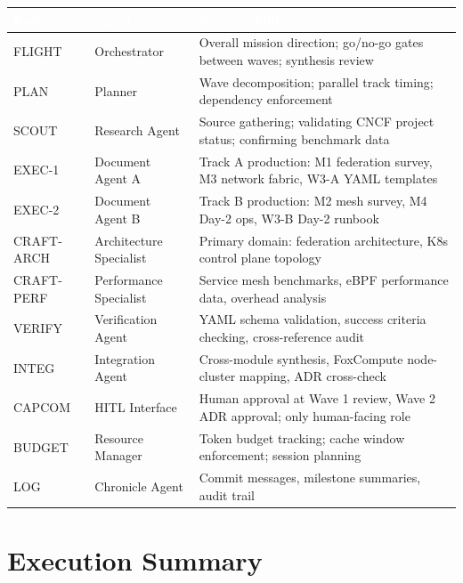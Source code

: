 \documentclass[11pt,letterpaper]{article}
\newcommand{\tableheader}[1]{\textbf{\sffamily\textcolor{white}{#1}}}
\begin{document}
\begin{center}
\begin{tabularx}{\textwidth}{L{2.2cm}L{2.5cm}X}
\toprule
{}
\tableheader{Role} & \tableheader{Agent} & \tableheader{Responsibility} \\
\midrule
FLIGHT & Orchestrator & Overall mission direction; go/no-go gates between waves; synthesis review \\
PLAN & Planner & Wave decomposition; parallel track timing; dependency enforcement \\
SCOUT & Research Agent & Source gathering; validating CNCF project status; confirming benchmark data \\
EXEC-1 & Document Agent A & Track A production: M1 federation survey, M3 network fabric, W3-A YAML templates \\
EXEC-2 & Document Agent B & Track B production: M2 mesh survey, M4 Day-2 ops, W3-B Day-2 runbook \\
CRAFT-ARCH & Architecture Specialist & Primary domain: federation architecture, K8s control plane topology \\
CRAFT-PERF & Performance Specialist & Service mesh benchmarks, eBPF performance data, overhead analysis \\
VERIFY & Verification Agent & YAML schema validation, success criteria checking, cross-reference audit \\
INTEG & Integration Agent & Cross-module synthesis, FoxCompute node-cluster mapping, ADR cross-check \\
CAPCOM & HITL Interface & Human approval at Wave 1 review, Wave 2 ADR approval; only human-facing role \\
BUDGET & Resource Manager & Token budget tracking; cache window enforcement; session planning \\
LOG & Chronicle Agent & Commit messages, milestone summaries, audit trail \\
\bottomrule
\end{tabularx}
\end{center}

\section{Execution Summary}
\end{document}
